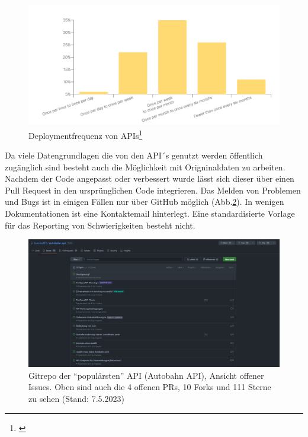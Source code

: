 \documentclass[notitlepage, hidelinks]{article}
\begin{document}
\begin{figure}[H]
\centering
  \includegraphics[width=\textwidth]{images/stateofapideploymentfreq.png}
  \caption{Deploymentfrequenz von APIs\protect\footnote{\cite{api-postman}}}
  \label{stateofapideploymentfreq}
\end{figure}

 Da viele Datengrundlagen die von den API´s genutzt werden öffentlich zugänglich sind besteht auch die Möglichkeit mit Origninaldaten zu arbeiten. Nachdem der Code angepasst oder verbessert wurde lässt sich dieser über einen Pull Request in den ursprünglichen Code integrieren. 
Das Melden von Problemen und Bugs ist in einigen Fällen nur über GitHub möglich (Abb.\ref{gitissues}). In wenigen Dokumentationen ist eine Kontaktemail hinterlegt. Eine standardisierte Vorlage für das Reporting von Schwierigkeiten besteht nicht.

\begin{figure}[H]
\centering
  \includegraphics[width=\textwidth]{images/gitissues.png}
  \caption{Gitrepo der ``populärsten'' API (Autobahn API), Ansicht offener Issues. Oben sind auch die 4 offenen PRs, 10 Forks und 111 Sterne zu sehen (Stand: 7.5.2023)}
  \label{gitissues}
\end{figure}
\end{document}
